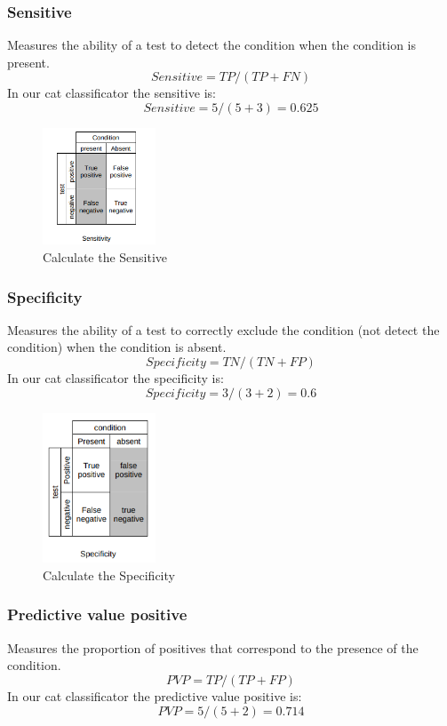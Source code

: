 \subsubsection[Sensitive]{Sensitive}
Measures the ability of a test to detect the condition when the condition is present.
\[ Sensitive = TP/(TP+FN) \]
In our cat classificator the sensitive is:
\[ Sensitive = 5/(5+3) = 0.625 \]

\begin{figure}[H]
\centering
\includegraphics[width=0.3\textwidth]{./figures/Sensitive}
\caption{Calculate the Sensitive}
\end{figure}

\subsubsection[Specificity]{Specificity}
Measures the ability of a test to correctly exclude the condition (not detect the condition) when the condition is absent.
\[ Specificity  = TN/(TN+FP) \]
In our cat classificator the specificity is:
\[ Specificity = 3/(3+2) = 0.6 \]

\begin{figure}[H]
\centering
\includegraphics[width=0.3\textwidth]{./figures/Specificity}
\caption{Calculate the Specificity}
\end{figure}

\subsubsection[Predictive value positive]{Predictive value positive}
Measures the proportion of positives that correspond to the presence of the condition.
\[ PVP  =  TP/(TP+FP) \]
In our cat classificator the predictive value positive is:
\[ PVP = 5/(5+2) = 0.714 \]

